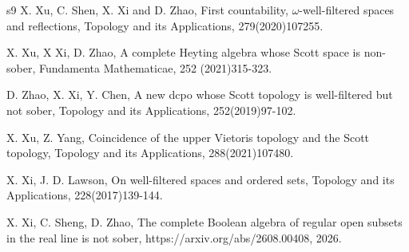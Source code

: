 \documentclass[preprint,12pt]{elsarticle}
\numberwithin{equation}{section}
\begin{document}
\begin{thebibliography}{s9}
 X. Xu, C. Shen, X. Xi and D. Zhao, First countability, $\omega$-well-filtered spaces and reflections, Topology and its Applications, 279(2020)107255.

 X. Xu, X Xi, D. Zhao, A complete Heyting algebra whose Scott space is non-sober, Fundamenta Mathematicae, 252 (2021)315-323.



 D. Zhao, X. Xi, Y. Chen, A new dcpo whose Scott topology is well-filtered but not sober, Topology and its Applications, 252(2019)97-102.






 X. Xu, Z. Yang, Coincidence of the upper Vietoris topology and the Scott topology, Topology and its Applications, 288(2021)107480.



 X. Xi, J. D. Lawson, On well-filtered spaces and ordered sets, Topology and its Applications, 228(2017)139-144.

 X. Xi, C. Sheng, D. Zhao, The complete Boolean algebra of regular open subsets in the real line is not sober, https://arxiv.org/abs/2608.00408, 2026.


\end{thebibliography}
\end{document}
